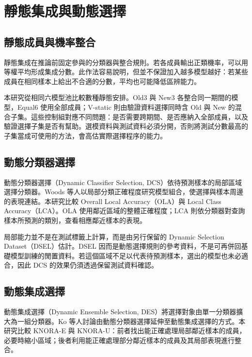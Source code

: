 \section{靜態集成與動態選擇}

\subsection{靜態成員與機率整合}

靜態集成在推論前固定參與的分類器與整合規則。若各成員輸出正類機率，可以用等權平均形成集成分數。此作法容易說明，但並不保證加入越多模型越好：若某些成員在相同樣本上給出不合適的分數，平均也可能降低區辨能力。

本研究從相同六模型池比較數種靜態安排。Old3 與 New3 各整合同一期間的模型，Equal6 使用全部成員；V-static 則由驗證資料選擇同時含 Old 與 New 的混合子集。這些控制組對應不同問題：是否需要跨期間、是否應納入全部成員，以及驗證選擇子集是否有幫助。選模資料與測試資料必須分開，否則將測試分數最高的子集當成可使用的方法，會高估實際選擇程序的能力。

\subsection{動態分類器選擇}

動態分類器選擇（Dynamic Classifier Selection, DCS）依待預測樣本的局部區域選擇分類器。Woods 等人\autocite{woods1997local}以局部分類正確程度研究模型組合，使選擇與樣本周邊的表現連結。本研究比較 Overall Local Accuracy（OLA）與 Local Class Accuracy（LCA）。OLA 使用鄰近區域的整體正確程度；LCA 則依分類器對查詢樣本所預測的類別，查看相應鄰近樣本的表現\autocite{deslib-ola-docs,deslib-lca-docs}。

局部能力並不是在測試標籤上計算，而是由另行保留的 Dynamic Selection Dataset（DSEL）估計。DSEL 因而是動態選擇規則的參考資料，不是可再併回基礎模型訓練的閒置資料。若這個區域不足以代表待預測樣本，選出的模型也未必適合，因此 DCS 的效果仍須透過保留測試資料確認。

\subsection{動態集成選擇}

動態集成選擇（Dynamic Ensemble Selection, DES）將選擇對象由單一分類器擴大為一組分類器。Ko 等人\autocite{ko2008dynamic}討論由動態分類器選擇延伸至動態集成選擇的方式。本研究比較 KNORA-E 與 KNORA-U：前者找出能正確處理局部鄰近樣本的成員，必要時縮小區域；後者利用能正確處理部分鄰近樣本的成員及其局部表現進行整合\autocite{deslib-knorae-docs,deslib-knorau-docs}。

